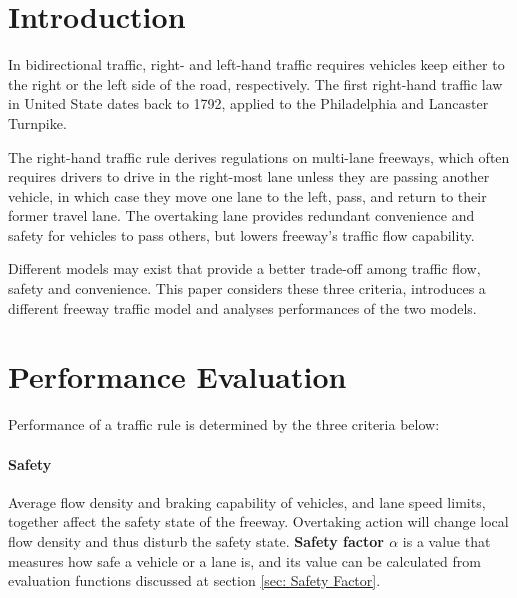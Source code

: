

\section{Introduction}
\label{sec: Introduction}

In bidirectional traffic, right- and left-hand traffic requires 
vehicles keep either to the right or the left side of the road, 
respectively.\cite{Draper_Geoff_1993} The first right-hand 
traffic law in United State dates back to 1792, applied to the 
Philadelphia and Lancaster Turnpike.
\cite{Weingroff_Richard_2014}

The right-hand traffic rule derives regulations on multi-lane 
freeways, which often requires drivers to drive in the 
right-most lane unless they are passing another vehicle, in 
which case they move one lane to the left, pass, and return 
to their former travel lane. The overtaking lane provides 
redundant convenience and safety for vehicles to pass others, 
but lowers freeway's traffic flow capability.

Different models may exist that provide a better trade-off 
among traffic flow, safety and convenience. This paper 
considers these three criteria, introduces a different 
freeway traffic model and analyses performances of the two 
models.




\section{Performance Evaluation}
\label{sec: Performance Evaluation}

Performance of a traffic rule is determined by the three 
criteria below: 

\paragraph{Safety} Average flow density and braking capability 
of vehicles, and lane speed limits, together affect the safety 
state of the freeway. Overtaking action will change local flow 
density and thus disturb the safety state. \textbf{Safety 
factor $\alpha$} is a value that measures how safe a vehicle 
or a lane is, and its value can be calculated from evaluation 
functions discussed at section \ref{sec: Safety Factor}.

